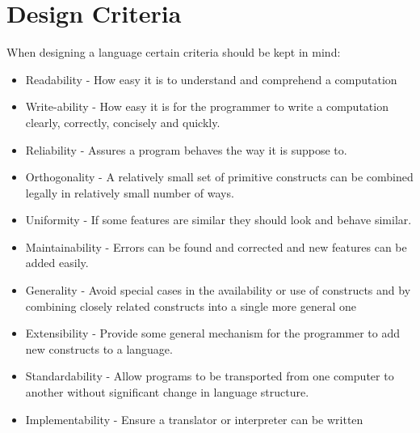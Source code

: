 \section{Design Criteria}
When designing a language certain criteria should be kept in mind:
\begin{itemize}
\item Readability
- How easy it is to understand and comprehend a computation
\item Write-ability
- How easy it is for the programmer to write a computation clearly, correctly, concisely and quickly. 
\item Reliability
- Assures a program behaves the way it is suppose to.
\item Orthogonality
- A relatively small set of primitive constructs can be combined legally in relatively small number of ways.
\item Uniformity
- If some features are similar they should look and behave similar.
\item Maintainability
- Errors can be found and corrected and new features can be added easily.
\item Generality
- Avoid special cases in the availability or use of constructs and by combining closely related constructs into a single more general one	
\item Extensibility
- Provide some general mechanism for the programmer to add new constructs to a language.
\item Standardability
- Allow programs to be transported from one computer to another without significant change in language structure.
\item Implementability
- Ensure a translator or interpreter can be written
\end{itemize}
